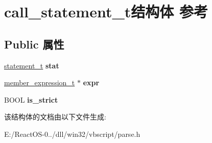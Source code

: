 \hypertarget{structcall__statement__t}{}\section{call\+\_\+statement\+\_\+t结构体 参考}
\label{structcall__statement__t}
\subsection*{Public 属性}
\begin{DoxyCompactItemize}
\item 
\mbox{\label{structcall__statement__t_a520b148c4c3bb0e9ef2c52f9843dd4f4}} 
\hyperlink{struct__statement__t}{statement\+\_\+t} {\bfseries stat}
\item 
\mbox{\label{structcall__statement__t_ac7c313eedea92f734bb2d74df5527490}} 
\hyperlink{structmember__expression__t}{member\+\_\+expression\+\_\+t} $\ast$ {\bfseries expr}
\item 
\mbox{\label{structcall__statement__t_a3c18c84867269072c88d66382669437b}} 
B\+O\+OL {\bfseries is\+\_\+strict}
\end{DoxyCompactItemize}


该结构体的文档由以下文件生成\+:\begin{DoxyCompactItemize}
\item 
E\+:/\+React\+O\+S-\/0../dll/win32/vbscript/parse.\+h\end{DoxyCompactItemize}
